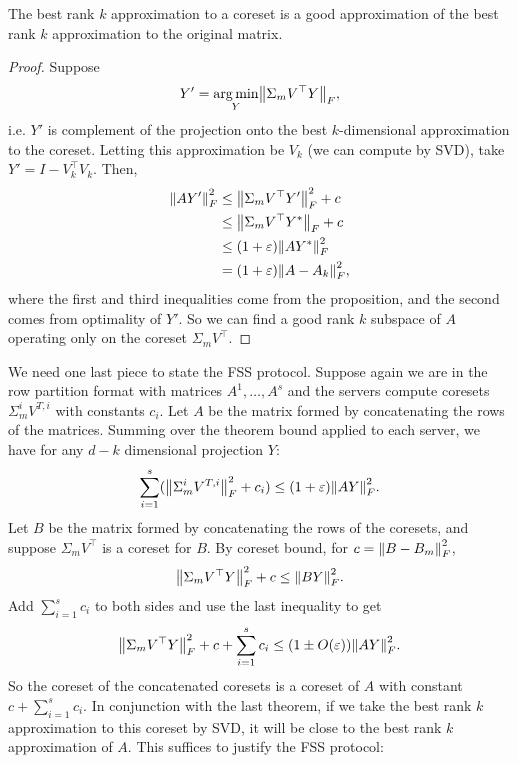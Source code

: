 \documentclass{article}
\begin{document}
\begin{thm}[]
    The best rank $k$ approximation to a coreset is a good approximation of the best rank $k$ approximation to the original matrix. 
\end{thm}
\begin{proof}
    Suppose 
    \[
        Y' = \argmin_{Y} \norm*{\Sigma _m V^{\top} Y}_{F} ,
    \]
    i.e. $Y'$ is complement of the projection onto the best $k$-dimensional approximation to the coreset. Letting this approximation be $V_k $ (we can compute by SVD), take $Y' = I - V_k ^{\top}V_k $. Then, 
    \begin{align*}
        \norm*{AY'}_{F} ^2 &\leq \norm*{\Sigma _m V^{\top} Y'}_{F} ^2 +c\\
        &\leq \norm*{\Sigma _m V^{\top} Y^* }_{F} + c\\
        &\leq (1+\eps )\norm*{AY^* }_{F} ^2
        \\&=  (1+\eps )\norm*{A- A_k }_{F} ^2,
    \end{align*}
    where the first and third inequalities come from the proposition, and the second comes from optimality of $Y'$. So we can find a good rank $k$ subspace of $A$ operating only on the coreset $\Sigma _m V^{\top} $. 
\end{proof}

We need one last piece to state the FSS protocol. Suppose again we are in the row partition format with matrices $A^1 ,\dots , A^s $ and the servers compute coresets $\Sigma _m ^i V^{T, i} $ with constants $c_i $. Let $A$ be the matrix formed by concatenating the rows of the matrices. Summing over the theorem bound applied to each server, we have for any $d-k$ dimensional projection $Y$:
\[
    \sum_{i=1}^s (\norm*{\Sigma _m ^i V^{T, i} }_{F} ^2 + c_i) \leq (1+\eps ) \norm*{AY}_{F} ^2 . 
\]
Let $B$ be the matrix formed by concatenating the rows of the coresets, and suppose $\Sigma _m V^{\top} $ is a coreset for $B$. By coreset bound, for $c = \norm*{B - B_m }_{F}^2  $,
\[
    \norm*{\Sigma _m V^{\top} Y}_{F}^2  + c \leq \norm*{BY}_{F} ^2 . 
\]
Add $\sum_{i=1}^s c_i $ to both sides and use the last inequality to get
\[
    \norm*{\Sigma _m V^{\top} Y}_{F}^2  + c + \sum_{i=1}^s c_i \leq (1\pm O(\eps ))\norm*{AY}_{F} ^2 . 
\]
So the coreset of the concatenated coresets is a coreset of $A$ with constant $c+\sum_{i=1}^s c_i $. In conjunction with the last theorem, if we take the best rank $k$ approximation to this coreset by SVD, it will be close to the best rank $k$ approximation of $A$. This suffices to justify the FSS protocol:
\end{document}
